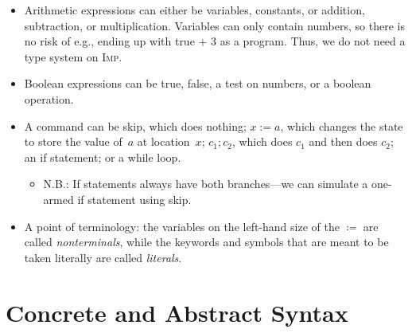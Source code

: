 \documentclass{lecturenotes}
\newcommand{\Imp}{\textsc{Imp}\xspace}
\newcommand{\Skip}{\textsf{skip}}
\begin{document}
\begin{itemize}
\begin{itemize}
  \end{itemize}
\item Arithmetic expressions can either be variables, constants, or addition, subtraction, or multiplication.
  Variables can only contain numbers, so there is no risk of e.g., ending up with \textsf{true + 3} as a program.
  Thus, we do not need a type system on \Imp.
\item Boolean expressions can be true, false, a test on numbers, or a boolean operation.
\item A command can be \Skip, which does nothing; $x := a$, which changes the state to store the value of~$a$ at location~$x$; $c_1; c_2$, which does $c_1$ and then does $c_2$; an if statement; or a while loop.
  \begin{itemize}
  \item N.B.: If statements always have both branches---we can simulate a one-armed if statement using \Skip.
  \end{itemize}
\item A point of terminology: the variables on the left-hand size of the $\coloneqq$ are called \emph{nonterminals}, while the keywords and symbols that are meant to be taken literally are called \emph{literals}.
\end{itemize}

\section{Concrete and Abstract Syntax}
\label{sec:concr-abstr-synt}
\end{document}
